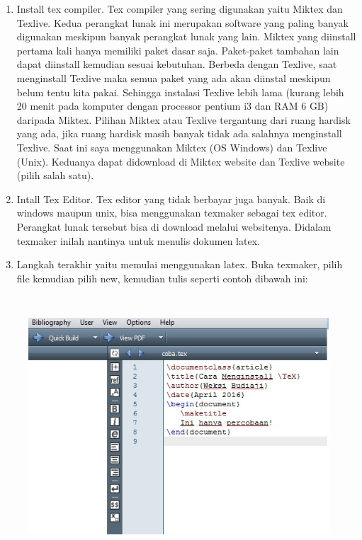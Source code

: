\documentclass[12pt,a4paper]{article}
\begin{document}
\begin{enumerate}
\item Install tex compiler. Tex compiler yang sering digunakan yaitu Miktex dan Texlive. Kedua perangkat lunak ini merupakan software yang paling banyak digunakan meskipun banyak perangkat lunak yang lain. Miktex yang diinstall pertama kali hanya memiliki paket dasar saja. Paket-paket tambahan lain dapat diinstall kemudian sesuai kebutuhan. Berbeda dengan Texlive, saat menginstall Texlive maka semua paket yang 
ada akan diinstal meskipun belum tentu kita pakai. Sehingga instalasi Texlive lebih lama (kurang lebih 20 menit pada komputer dengan processor pentium i3 dan RAM 6 GB) daripada Miktex. Pilihan Miktex atau Texlive tergantung dari ruang hardisk yang ada, jika ruang hardisk masih banyak tidak ada salahnya menginstall Texlive. Saat ini saya menggunakan Miktex 
(OS Windows) dan Texlive (Unix). Keduanya dapat didownload di Miktex website dan Texlive website (pilih salah satu).
\item Intall Tex Editor. Tex editor yang tidak berbayar juga banyak. Baik di windows maupun unix, bisa menggunakan texmaker sebagai tex editor. Perangkat lunak tersebut bisa di download melalui websitenya. Didalam texmaker inilah nantinya untuk menulis dokumen latex.
\item Langkah terakhir yaitu memulai menggunakan latex. Buka texmaker, pilih file kemudian pilih new, kemudian tulis seperti contoh dibawah ini:
\setcounter{numberedCntC}{\theenumi}
\end{enumerate}

\begin{figure}[ht]
\centering
\includegraphics[width=13.54cm,height=9.78cm]{gambar/image1.jpg}
\end{figure}
\end{document}
